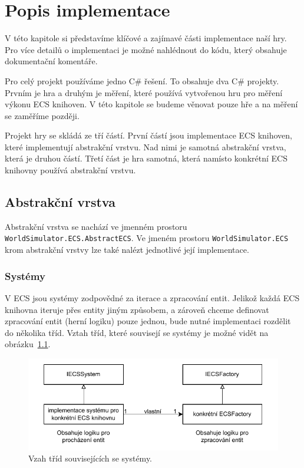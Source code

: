 \chapter{Popis implementace}
V této kapitole si představíme klíčové a zajímavé části implementace naší hry. Pro více detailů o implementaci je možné nahlédnout do kódu, který obsahuje dokumentační komentáře.

Pro celý projekt používáme jedno C\# řešení. To obsahuje dva C\# projekty. Prvním je hra a druhým je měření, které používá vytvořenou hru pro měření výkonu ECS knihoven. V této kapitole se budeme věnovat pouze hře a na měření se zaměříme později.

Projekt hry se skládá ze tří částí. První částí jsou implementace ECS knihoven, které implementují abstrakční vrstvu. Nad nimi je samotná abstrakční vrstva, která je druhou částí. Třetí část je hra samotná, která namísto konkrétní ECS knihovny používá abstrakční vrstvu.

\section{Abstrakční vrstva}
\label{sec:abstract-layer}
Abstrakční vrstva se nachází ve jmenném prostoru \texttt{WorldSimulator.ECS.AbstractECS}. Ve jmeném prostoru \texttt{WorldSimulator.ECS} krom abstrakční vrstvy lze také nalézt jednotlivé její implementace.

\subsection{Systémy}
V ECS jsou systémy zodpovědné za iterace a zpracování entit. Jelikož každá ECS knihovna iteruje přes entity jiným způsobem, a zároveň chceme definovat zpracování entit (herní logiku) pouze jednou, bude nutné implementaci rozdělit do několika tříd. Vztah tříd, které souvisejí se systémy je možné vidět na obrázku~\ref{fig:abstract-layer-systems}.

\begin{figure}[!htb]
  \centering
  \includegraphics[width=0.66\linewidth]{img/abstract-layer-systems.pdf}
  \caption{Vzah tříd souvisejících se systémy.}
  \label{fig:abstract-layer-systems}
\end{figure}

